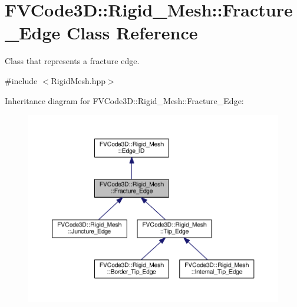 \hypertarget{classFVCode3D_1_1Rigid__Mesh_1_1Fracture__Edge}{}\section{F\+V\+Code3D\+:\+:Rigid\+\_\+\+Mesh\+:\+:Fracture\+\_\+\+Edge Class Reference}
\label{classFVCode3D_1_1Rigid__Mesh_1_1Fracture__Edge}


Class that represents a fracture edge.  




{\ttfamily \#include $<$Rigid\+Mesh.\+hpp$>$}



Inheritance diagram for F\+V\+Code3D\+:\+:Rigid\+\_\+\+Mesh\+:\+:Fracture\+\_\+\+Edge\+:
\nopagebreak
\begin{figure}[H]
\begin{center}
\leavevmode
\includegraphics[width=350pt]{classFVCode3D_1_1Rigid__Mesh_1_1Fracture__Edge__inherit__graph}
\end{center}
\end{figure}


